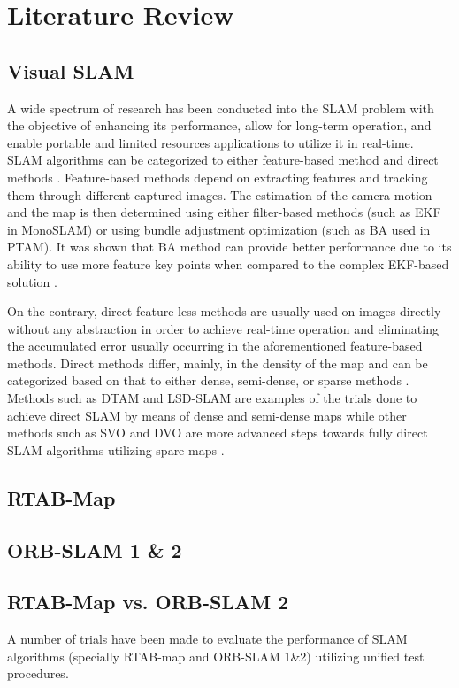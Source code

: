 \documentclass[12pt]{article}
\begin{document}
\section{Literature Review}
\subsection{Visual SLAM}
\indent A wide spectrum of research has been conducted into the SLAM problem with the objective of enhancing its performance, allow for long-term operation, and enable portable and limited resources applications to utilize it in real-time. SLAM algorithms can be categorized to either feature-based method and direct methods \cite{taketomi2017visual}. Feature-based methods depend on extracting features and tracking them through different captured images. The estimation of the camera motion and the map is then determined using either filter-based methods (such as EKF in MonoSLAM) or using bundle adjustment optimization (such as BA used in PTAM). It was shown that BA method can provide better performance due to its ability to use more feature key points when compared to the complex EKF-based solution \cite{strasdat2012visual}. 

On the contrary, direct feature-less methods are usually used on images directly without any abstraction \cite{taketomi2017visual} in order to achieve real-time operation and eliminating the accumulated error usually occurring in the aforementioned feature-based methods. Direct methods differ, mainly, in the density of the map and can be categorized based on that to either dense, semi-dense, or sparse methods \cite{taketomi2017visual}. Methods such as DTAM and LSD-SLAM are examples of the trials done to achieve direct SLAM by means of dense and semi-dense maps while other methods such as SVO and DVO are more advanced steps towards fully direct SLAM algorithms utilizing spare maps \cite{cadena2016past}\cite{taketomi2017visual}.

\subsection{RTAB-Map}
\subsection{ORB-SLAM 1 \& 2}
\subsection{RTAB-Map vs. ORB-SLAM 2}
A number of trials have been made to evaluate the performance of SLAM algorithms (specially RTAB-map and ORB-SLAM 1\&2)  utilizing unified test procedures.
\end{document}
